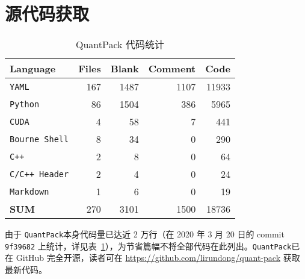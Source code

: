 \documentclass[
  fontset = source,
]{shtthesis}
\providecommand{\QP}{\texttt{QuantPack}}
\begin{document}
\section{源代码获取}

\begin{table}[htb]
  \centering
  \caption{QuantPack 代码统计}
  \label{tab::aappendix::cloc}
  \begin{tabular}{l *{4}{r}}
    \toprule
    Language &                   Files &        Blank &      Comment &         Code \\
    \midrule
    \texttt{YAML} &                167 &         1487 &         1107 &        11933 \\
    \texttt{Python} &               86 &         1504 &          386 &         5965 \\
    \texttt{CUDA} &                  4 &           58 &            7 &          441 \\
    \texttt{Bourne Shell} &          8 &           34 &            0 &          290 \\
    \texttt{C++} &                   2 &            8 &            0 &           64 \\
    \texttt{C/C++ Header} &          2 &            4 &            0 &           24 \\
    \texttt{Markdown} &              1 &            6 &            0 &           19 \\
    \hdashline
    \textbf{SUM} &                 270 &         3101 &         1500 &        18736 \\
    \bottomrule
  \end{tabular}
\end{table}

由于 \QP 本身代码量已达近 2 万行（在 2020 年 3 月 20 日的 commit \verb|9f39682| 上统计，详见表~\ref{tab::aappendix::cloc}），为节省篇幅不将全部代码在此列出。\QP 已在 GitHub 完全开源，读者可在 \url{https://github.com/lirundong/quant-pack} 获取最新代码。
\end{document}
